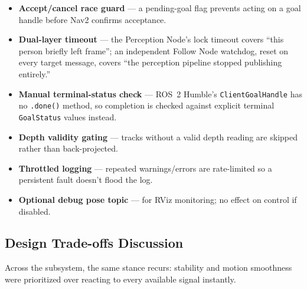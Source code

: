 \begin{itemize}
    \item \textbf{Accept/cancel race guard} --- a pending-goal flag prevents acting on a goal handle before Nav2 confirms acceptance.
    \item \textbf{Dual-layer timeout} --- the Perception Node's lock timeout covers ``this person briefly left frame''; an independent Follow Node watchdog, reset on every target message, covers ``the perception pipeline stopped publishing entirely.''
    \item \textbf{Manual terminal-status check} --- ROS~2 Humble's \texttt{ClientGoalHandle} has no \texttt{.done()} method, so completion is checked against explicit terminal \texttt{GoalStatus} values instead.
    \item \textbf{Depth validity gating} --- tracks without a valid depth reading are skipped rather than back-projected.
    \item \textbf{Throttled logging} --- repeated warnings/errors are rate-limited so a persistent fault doesn't flood the log.
    \item \textbf{Optional debug pose topic} --- for RViz monitoring; no effect on control if disabled.
\end{itemize}
 
\subsection{Design Trade-offs Discussion}
\label{sec:tradeoffs}
 
Across the subsystem, the same stance recurs: stability and motion smoothness were prioritized over reacting to every available signal instantly.
 
